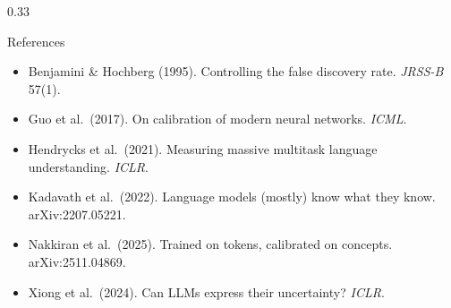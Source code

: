 \documentclass[final]{beamer}
\begin{document}
\begin{frame}[t]
\begin{columns}[t]
\begin{column}{0.33\linewidth}
    \begin{block}{References}
      \begin{itemize}
        \item Benjamini \& Hochberg (1995). Controlling the false discovery
          rate. \emph{JRSS-B} 57(1).
        \vspace{0.8em}
        \item Guo et al.\ (2017). On calibration of modern neural networks.
          \emph{ICML}.
        \vspace{0.8em}
        \item Hendrycks et al.\ (2021). Measuring massive multitask language
          understanding. \emph{ICLR}.
        \vspace{0.8em}
        \item Kadavath et al.\ (2022). Language models (mostly) know what
          they know. arXiv:2207.05221.
        \vspace{0.8em}
        \item Nakkiran et al.\ (2025). Trained on tokens, calibrated on
          concepts. arXiv:2511.04869.
        \vspace{0.8em}
        \item Xiong et al.\ (2024). Can LLMs express their uncertainty?
          \emph{ICLR}.
      \end{itemize}
    \end{block}
  \end{column}

\end{columns}

\end{frame}
\end{document}
